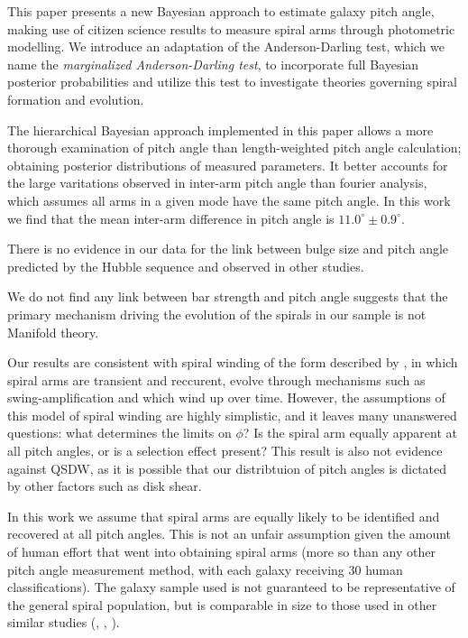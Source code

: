 This paper presents a new Bayesian approach to estimate galaxy pitch angle, making use of citizen science results to measure spiral arms through photometric modelling. We introduce an adaptation of the Anderson-Darling test, which we name the \textit{marginalized Anderson-Darling test}, to incorporate full Bayesian posterior probabilities and utilize this test to investigate theories governing spiral formation and evolution.

The hierarchical Bayesian approach implemented in this paper allows a more thorough examination of pitch angle than length-weighted pitch angle calculation; obtaining posterior distributions of measured parameters. It better accounts for the large varitations observed in inter-arm pitch angle than fourier analysis, which assumes all arms in a given mode have the same pitch angle. In this work we find that the mean inter-arm difference in pitch angle is $11.0^\circ\pm 0.9^\circ$.

There is no evidence in our data for the link between bulge size and pitch angle predicted by the Hubble sequence and observed in other studies.

We do not find any link between bar strength and pitch angle suggests that the primary mechanism driving the evolution of the spirals in our sample is not Manifold theory.

Our results are consistent with spiral winding of the form described by \citet{2019arXiv190910291P}, in which spiral arms are transient and reccurent, evolve through mechanisms such as swing-amplification \citep{1965MNRAS.130..125G} and which wind up over time. However, the assumptions of this model of spiral winding are highly simplistic, and it leaves many unanswered questions: what determines the limits on $\phi$? Is the spiral arm equally apparent at all pitch angles, or is a selection effect present? This result is also not evidence against QSDW, as it is possible that our distribtuion of pitch angles is dictated by other factors such as disk shear.

In this work we assume that spiral arms are equally likely to be identified and recovered at all pitch angles. This is not an unfair assumption given the amount of human effort that went into obtaining spiral arms (more so than any other pitch angle measurement method, with each galaxy receiving 30 human classifications). The galaxy sample used is not guaranteed to be representative of the general spiral population, but is comparable in size to those used in other similar studies (\citealt{2013MNRAS.436.1074S}, \citealt{2019ApJ...871..194Y}, \citealt{2019arXiv190910291P}).

